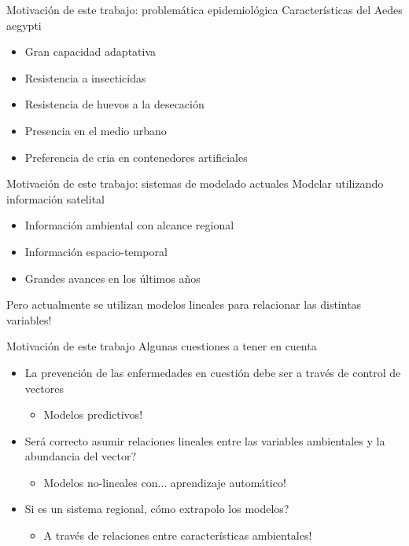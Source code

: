 \documentclass[10pt]{beamer}
\begin{document}
\begin{frame}{Motivación de este trabajo: problemática epidemiológica}
  Características del Aedes aegypti
  \pause
  \begin{itemize}[<+->]
   \item Gran capacidad adaptativa
   \item Resistencia a insecticidas
   \item Resistencia de huevos a la desecación
   \item Presencia en el medio urbano
   \item Preferencia de cria en contenedores artificiales
  \end{itemize}
\end{frame}



\begin{frame}{Motivación de este trabajo: sistemas de modelado actuales}
  Modelar utilizando información satelital
  \pause
  \begin{itemize}[<+->]
   \item Información ambiental con alcance regional
   \item Información espacio-temporal
   \item Grandes avances en los últimos años
   \pause

  \end{itemize}
  \begin{center}
    Pero actualmente se utilizan modelos lineales para relacionar las distintas
    variables!
  \end{center}

\end{frame}



\begin{frame}{Motivación de este trabajo}
  Algunas cuestiones a tener en cuenta
  \pause
  \begin{itemize}[<+->]
   \item La prevención de las enfermedades en cuestión debe ser a través de control de vectores
   \begin{itemize}
     \item Modelos predictivos!
   \end{itemize}
   \item Será correcto asumir relaciones lineales entre las variables ambientales y la abundancia del vector?
   \begin{itemize}
     \item Modelos no-lineales con... aprendizaje automático!
   \end{itemize}
   \item Si es un sistema regional, cómo extrapolo los modelos?
   \begin{itemize}
     \item A través de relaciones entre características ambientales!
   \end{itemize}
  \end{itemize}

\end{frame}
\end{document}
